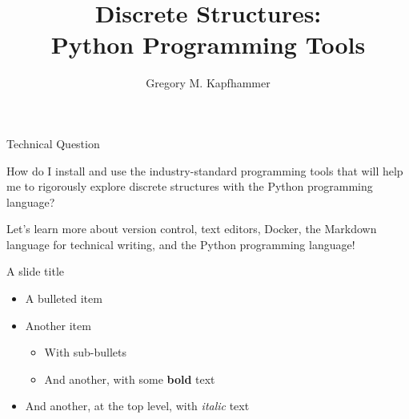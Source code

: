 \documentclass[14pt,aspectratio=169]{beamer}
\title{Discrete Structures: \\ Python Programming Tools}
\author{Gregory M. Kapfhammer}
\institute[shortinst]{Department of Computer Science, Allegheny College}
\begin{document}
{
  \begin{frame}
    \titlepage
  \end{frame}
}


\begin{frame}{Technical Question}

  \begin{center}
    {\large How do I install and use the industry-standard programming tools that will
    help me to rigorously explore discrete structures with the Python
  programming language?}
  \end{center}

  \vspace{2ex}

  \begin{center}
    \small Let's learn more about version control, text editors, Docker,
    the Markdown language for technical writing, and the Python programming
    language!
  \end{center}

\end{frame}


\begin{frame}{A slide title}

  \begin{itemize}
    \item A bulleted item
    \item Another item
      \begin{itemize}
        \item With sub-bullets
        \item And another, with some \textbf{bold} text
      \end{itemize}
    \item And another, at the top level, with \textit{italic} text
  \end{itemize}


\end{frame}
\end{document}

